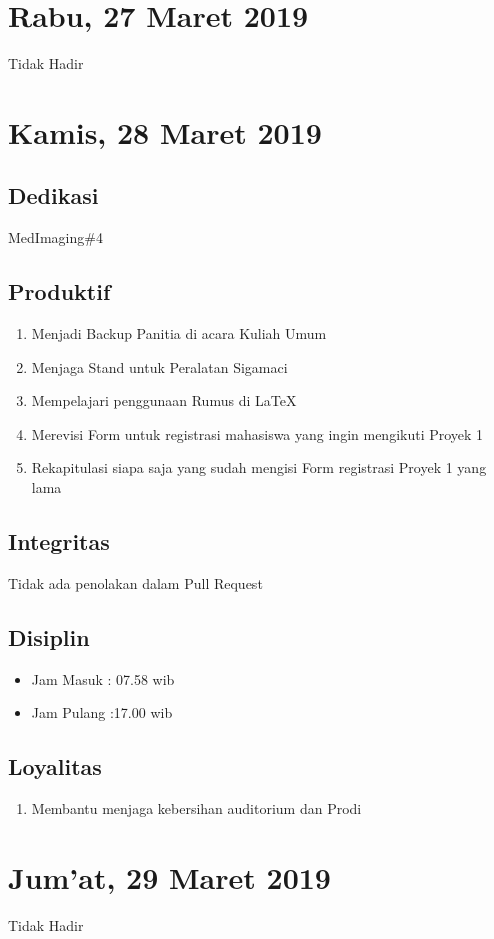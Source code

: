 \section{Rabu, 27 Maret 2019}
Tidak Hadir

\section{Kamis, 28 Maret 2019}
\subsection{Dedikasi}
MedImaging\#4
\subsection{Produktif}
\begin{enumerate}
\item Menjadi Backup Panitia di acara Kuliah Umum
\item Menjaga Stand untuk Peralatan Sigamaci
\item Mempelajari penggunaan Rumus di LaTeX
\item Merevisi Form untuk registrasi mahasiswa yang ingin mengikuti Proyek 1
\item Rekapitulasi siapa saja yang sudah mengisi Form registrasi Proyek 1 yang lama
\end{enumerate}
\subsection{Integritas}
Tidak ada penolakan dalam Pull Request
\subsection{Disiplin}
\begin{itemize}
\item Jam Masuk : 07.58 wib
\item Jam Pulang :17.00 wib
\end{itemize}
\subsection{Loyalitas}
\begin{enumerate}
\item Membantu menjaga kebersihan auditorium dan Prodi
\end{enumerate}

\section{Jum'at, 29 Maret 2019}
Tidak Hadir


